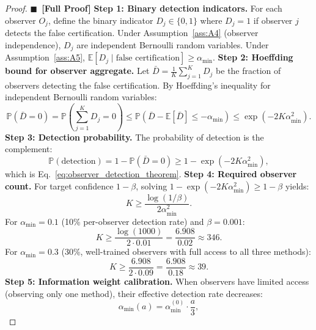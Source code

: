 \documentclass[11pt,a4paper]{article}
\theoremstyle{definition}
\newcommand{\rigorFull}[0]{$\blacksquare$~\textbf{[Full Proof]}}
\newcommand{\E}{\mathbb{E}}
\newcommand{\Pbb}{\mathbb{P}}
\begin{document}
\begin{proof}\rigorFull
\textbf{Step 1: Binary detection indicators.} For each observer $O_j$, define the binary indicator $D_j \in \{0, 1\}$ where $D_j = 1$ if observer $j$ detects the false certification. Under Assumption~\ref{ass:A4} (observer independence), $D_j$ are independent Bernoulli random variables. Under Assumption~\ref{ass:A5}, $\E[D_j \mid \text{false certification}] \geq \alpha_{\min}$.
\textbf{Step 2: Hoeffding bound for observer aggregate.} Let $\bar{D} = \frac{1}{K} \sum_{j=1}^{K} D_j$ be the fraction of observers detecting the false certification. By Hoeffding's inequality for independent Bernoulli random variables:
\begin{equation}
    \Pbb(\bar{D} = 0) = \Pbb\left(\sum_{j=1}^{K} D_j = 0\right) \leq \Pbb\left(\bar{D} - \E[\bar{D}] \leq -\alpha_{\min}\right) \leq \exp(-2K \alpha_{\min}^2).
    \label{eq:hoeffding_observers}
\end{equation}
\textbf{Step 3: Detection probability.} The probability of detection is the complement:
\begin{equation}
    \Pbb(\text{detection}) = 1 - \Pbb(\bar{D} = 0) \geq 1 - \exp(-2K \alpha_{\min}^2),
    \label{eq:detection_prob}
\end{equation}
which is Eq.~\eqref{eq:observer_detection_theorem}.
\textbf{Step 4: Required observer count.} For target confidence $1 - \beta$, solving $1 - \exp(-2K \alpha_{\min}^2) \geq 1 - \beta$ yields:
\begin{equation}
    K \geq \frac{\log(1/\beta)}{2 \alpha_{\min}^2}.
    \label{eq:K_required}
\end{equation}
For $\alpha_{\min} = 0.1$ (10\% per-observer detection rate) and $\beta = 0.001$:
\begin{equation}
    K \geq \frac{\log(1000)}{2 \cdot 0.01} = \frac{6.908}{0.02} \approx 346.
    \label{eq:K_example}
\end{equation}
For $\alpha_{\min} = 0.3$ (30\%, well-trained observers with full access to all three methods):
\begin{equation}
    K \geq \frac{6.908}{2 \cdot 0.09} = \frac{6.908}{0.18} \approx 39.
    \label{eq:K_example2}
\end{equation}
\textbf{Step 5: Information weight calibration.} When observers have limited access (observing only one method), their effective detection rate decreases:
\begin{equation}
    \alpha_{\min}(a) = \alpha_{\min}^{(0)} \cdot \frac{a}{3},
    \label{eq:alpha_access}
\end{equation}

\end{proof}
\end{document}
